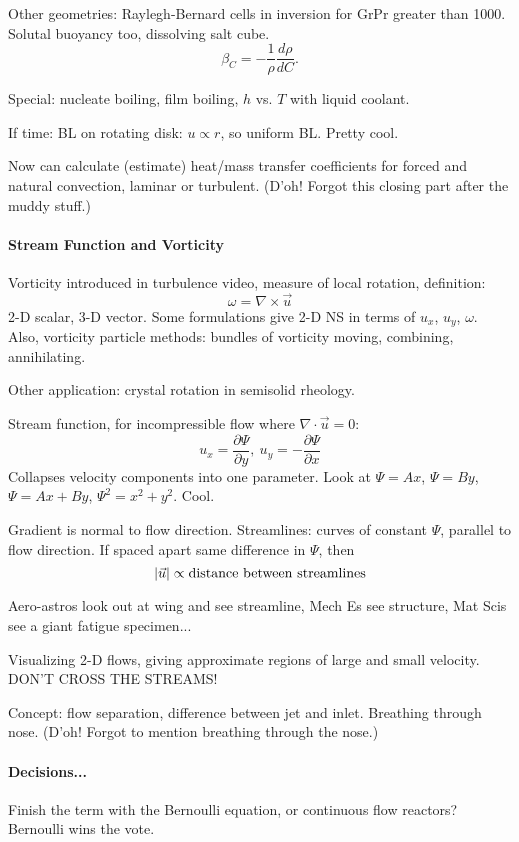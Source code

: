 \documentclass{report}
\begin{document}
Other geometries: Raylegh-Bernard cells in inversion for GrPr greater than
1000.  Solutal buoyancy too, dissolving salt cube.
$$\beta_C = -\frac{1}{\rho}\frac{d\rho}{dC}.$$

Special: nucleate boiling, film boiling, $h$ vs. $T$ with liquid coolant.

If time: BL on rotating disk: $u\propto r$, so uniform BL.  Pretty cool.

Now can calculate (estimate) heat/mass transfer coefficients for forced and
natural convection, laminar or turbulent.  (D'oh!  Forgot this closing part
after the muddy stuff.)

\paragraph{Stream Function and Vorticity}

Vorticity introduced in turbulence video, measure of local rotation,
definition:
$$\omega = \nabla\times\vec{u}$$
2-D scalar, 3-D vector.  Some formulations give 2-D NS in terms of $u_x$,
$u_y$, $\omega$.  Also, vorticity particle methods: bundles of vorticity
moving, combining, annihilating.

Other application: crystal rotation in semisolid rheology.

Stream function, for incompressible flow where $\nabla\cdot\vec{u}=0$:
$$u_x = \frac{\partial\Psi}{\partial y},
\ u_y = -\frac{\partial\Psi}{\partial x}$$
Collapses velocity components into one parameter.  Look at $\Psi=Ax$,
$\Psi=By$, $\Psi=Ax+By$, $\Psi^2=x^2+y^2$.  Cool.

Gradient is normal to flow direction.  Streamlines: curves of constant $\Psi$,
parallel to flow direction.  If spaced apart same difference in $\Psi$, then
$$\left|\vec{u}\right| \propto {\rm distance\ between\ streamlines}$$

Aero-astros look out at wing and see streamline, Mech Es see structure, Mat
Scis see a giant fatigue specimen...

Visualizing 2-D flows, giving approximate regions of large and small velocity.
DON'T CROSS THE STREAMS!

Concept: flow separation, difference between jet and inlet.  Breathing through
nose.  (D'oh!  Forgot to mention breathing through the nose.)

\paragraph{Decisions...} Finish the term with the Bernoulli equation, or
continuous flow reactors?  Bernoulli wins the vote.
\newpage
\end{document}
